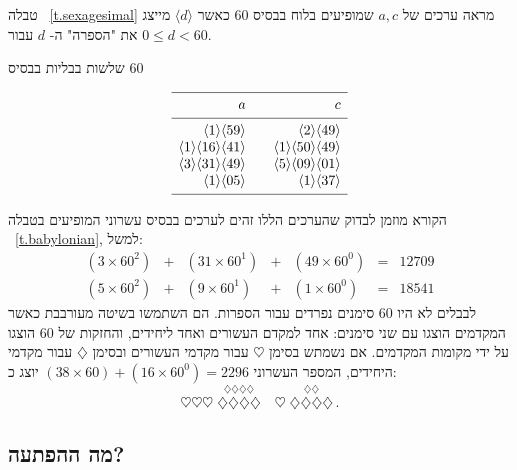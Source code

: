טבלה%
~\ref{t.sexagesimal}
מראה ערכים של
$a,c$
שמופיעים בלוח בבסיס
$60$
כאשר 
$\langle d\rangle$
מייצג את "הספרה" ה-%
$d$
עבור
$0\leq d<60$.
\begin{table}[t]
\caption{שלשות בבליות
בבסיס
$60$}\label{t.sexagesimal}
\vspace{-3ex}
\[
\begin{array}{r@{$\quad\quad$}r}
\hline
\noalign{\smallskip}
a&c\\
\noalign{\smallskip}\hline\noalign{\smallskip}
\langle 1\rangle \langle 59 \rangle&\langle 2\rangle \langle 49 \rangle\\
\langle 1\rangle \langle 16 \rangle\langle 41\rangle&\langle 1\rangle \langle 50 \rangle\langle 49\rangle\\
\langle 3\rangle \langle 31 \rangle\langle 49\rangle&\langle 5\rangle \langle 09 \rangle\langle 01\rangle\\
\langle 1\rangle \langle 05 \rangle&\langle 1\rangle \langle 37 \rangle\\
\noalign{\smallskip}\hline
\end{array}
\]
\vspace{-3ex}
\end{table}
הקורא מוזמן לבדוק שהערכים הללו זהים לערכים בבסיס עשרוני המופיעים בטבלה%
~\ref{t.babylonian},
למשל:
\[
\renewcommand{\arraystretch}{1.3}
\begin{array}{lclclcr}
(3\times 60^2) &+& (31\times 60^1) &+& (49\times 60^0) &=&   12709\\
(5\times 60^2) &+& (9\times 60^1) &+& (1\times 60^0) &=& 18541
\end{array}
\]
לבבלים לא היו
$60$
סימנים נפרדים עבור הספרות. הם השתמשו בשיטה מעורבבת כאשר המקדמים הוצגו עם שני סימנים: אחד למקדם העשורים ואחד ליחידים, והחזקות של $60$ הוצגו על ידי מקומות המקדמים.
אם נשמתש בסימן
$\heartsuit$
עבור מקדמי העשורים ובסימן
$\diamondsuit$ 
עבור מקדמי היחידים, המספר העשרוני
$(38\times 60)+(16\times 60^0)=2296$
יוצג כ:
\[
\heartsuit\heartsuit\heartsuit \; \stackrel{\displaystyle\diamondsuit\diamondsuit\diamondsuit\diamondsuit}{\diamondsuit\diamondsuit\diamondsuit\diamondsuit}
\quad
\heartsuit \; \stackrel{\displaystyle\diamondsuit\diamondsuit}{\diamondsuit\diamondsuit\diamondsuit\diamondsuit}\,.
\]


\subsection*{מה ההפתעה?}

